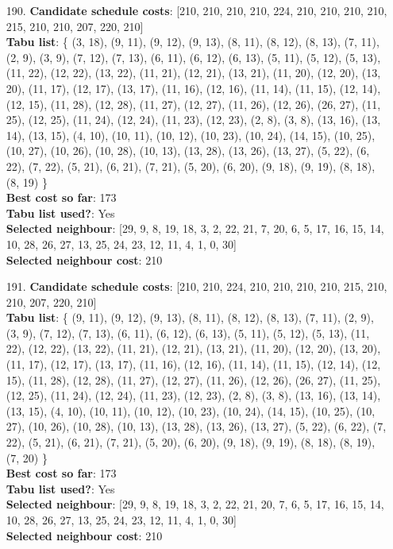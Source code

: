 \documentclass[fleqn]{article}
\begin{document}
\begin{itemize}
    \item[190.] \textbf{Candidate schedule costs}: [210, 210, 210, 210, 224, 210, 210, 210, 210, 215, 210, 210, 207, 220, 210] \\
    \textbf{Tabu list}: \{ (3, 18), (9, 11), (9, 12), (9, 13), (8, 11), (8, 12), (8, 13), (7, 11), (2, 9), (3, 9), (7, 12), (7, 13), (6, 11), (6, 12), (6, 13), (5, 11), (5, 12), (5, 13), (11, 22), (12, 22), (13, 22), (11, 21), (12, 21), (13, 21), (11, 20), (12, 20), (13, 20), (11, 17), (12, 17), (13, 17), (11, 16), (12, 16), (11, 14), (11, 15), (12, 14), (12, 15), (11, 28), (12, 28), (11, 27), (12, 27), (11, 26), (12, 26), (26, 27), (11, 25), (12, 25), (11, 24), (12, 24), (11, 23), (12, 23), (2, 8), (3, 8), (13, 16), (13, 14), (13, 15), (4, 10), (10, 11), (10, 12), (10, 23), (10, 24), (14, 15), (10, 25), (10, 27), (10, 26), (10, 28), (10, 13), (13, 28), (13, 26), (13, 27), (5, 22), (6, 22), (7, 22), (5, 21), (6, 21), (7, 21), (5, 20), (6, 20), (9, 18), (9, 19), (8, 18), (8, 19) \} \\
    \textbf{Best cost so far}: 173 \\
    \textbf{Tabu list used?}: Yes \\
    \textbf{Selected neighbour}: [29, 9, 8, 19, 18, 3, 2, 22, 21, 7, 20, 6, 5, 17, 16, 15, 14, 10, 28, 26, 27, 13, 25, 24, 23, 12, 11, 4, 1, 0, 30] \\
    \textbf{Selected neighbour cost}: 210
      

    \item[191.] \textbf{Candidate schedule costs}: [210, 210, 224, 210, 210, 210, 210, 215, 210, 210, 207, 220, 210] \\
    \textbf{Tabu list}: \{ (9, 11), (9, 12), (9, 13), (8, 11), (8, 12), (8, 13), (7, 11), (2, 9), (3, 9), (7, 12), (7, 13), (6, 11), (6, 12), (6, 13), (5, 11), (5, 12), (5, 13), (11, 22), (12, 22), (13, 22), (11, 21), (12, 21), (13, 21), (11, 20), (12, 20), (13, 20), (11, 17), (12, 17), (13, 17), (11, 16), (12, 16), (11, 14), (11, 15), (12, 14), (12, 15), (11, 28), (12, 28), (11, 27), (12, 27), (11, 26), (12, 26), (26, 27), (11, 25), (12, 25), (11, 24), (12, 24), (11, 23), (12, 23), (2, 8), (3, 8), (13, 16), (13, 14), (13, 15), (4, 10), (10, 11), (10, 12), (10, 23), (10, 24), (14, 15), (10, 25), (10, 27), (10, 26), (10, 28), (10, 13), (13, 28), (13, 26), (13, 27), (5, 22), (6, 22), (7, 22), (5, 21), (6, 21), (7, 21), (5, 20), (6, 20), (9, 18), (9, 19), (8, 18), (8, 19), (7, 20) \} \\
    \textbf{Best cost so far}: 173 \\
    \textbf{Tabu list used?}: Yes \\
    \textbf{Selected neighbour}: [29, 9, 8, 19, 18, 3, 2, 22, 21, 20, 7, 6, 5, 17, 16, 15, 14, 10, 28, 26, 27, 13, 25, 24, 23, 12, 11, 4, 1, 0, 30] \\
    \textbf{Selected neighbour cost}: 210
      


\end{itemize}
\end{document}
